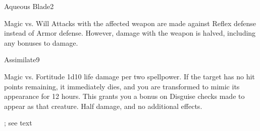 \begin{spellsection}{Aqueous Blade}{2}
    \begin{spellheader}
    \end{spellheader}
    \begin{spellcontent}
        \begin{spelltargetinginfo}
        \end{spelltargetinginfo}
        \begin{spelleffects}
            \begin{spellattack}{Magic vs. Will}
                \spellsuccess Attacks with the affected weapon are made against Reflex defense instead of Armor defense. However, damage with the weapon is halved, including any bonuses to damage.
            \end{spellattack}
            \spelldur \durshort
        \end{spelleffects}
    \end{spellcontent}
    \begin{spellfooter}
        \miscastrandom
    \end{spellfooter}
\end{spellsection}

\begin{spellsection}{Assimilate}{9}
    \begin{spellheader}
    \end{spellheader}
    \begin{spellcontent}
        \begin{spelltargetinginfo}
        \end{spelltargetinginfo}
        \begin{spelleffects}
            \begin{spellattack}{Magic vs. Fortitude}
                \spellsuccess 1d10 life damage per two spellpower. If the target has no hit points remaining, it immediately dies, and you are transformed to mimic its appearance for 12 hours. This grants you a  bonus on Disguise checks made to appear as that creature.
                \spellfailure Half damage, and no additional effects.
            \end{spellattack}
            \spelldur \durext; see text
        \end{spelleffects}
    \end{spellcontent}
    \begin{spellfooter}
        \miscastrandom
    \end{spellfooter}
\end{spellsection}

